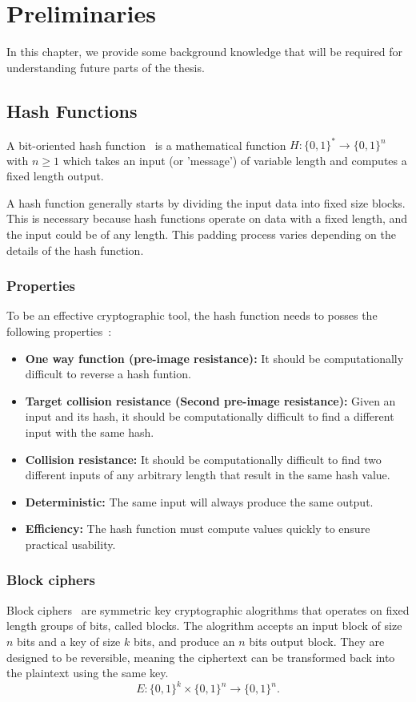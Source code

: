 \chapter{Preliminaries}
\label{sec:theory}
In this chapter, we provide some background knowledge that will be required for understanding future parts of the thesis.

\section{Hash Functions}
A bit-oriented hash function~\cite{preneel1994cryptographic} is a mathematical function $H : \{0,1\}^* \rightarrow \{0,1\}^n$ with $n\geq1$ which takes an input (or 'message') of variable length and computes a fixed length output.

A hash function generally starts by dividing the input data into fixed size blocks. This is necessary because hash functions operate on data with a fixed length, and the input could be of any length. This padding process varies depending on the details of the hash function.

\subsection*{Properties}
To be an effective cryptographic tool, the hash function needs to posses the following properties~\cite{preneel1993analysis}:
\begin{itemize}
    \item \textbf{One way function (pre-image resistance):} It should be computationally difficult to reverse a hash funtion.
    \item \textbf{Target collision resistance (Second pre-image resistance):} Given an input and its hash, it should be computationally difficult to find a different input with the same hash.
    \item \textbf{Collision resistance:} It should be computationally difficult to find two different inputs of any arbitrary length that result in the same hash value.
    \item \textbf{Deterministic:} The same input will always produce the same output.
    \item \textbf{Efficiency:} The hash function must compute values quickly to ensure practical usability.
\end{itemize}

\subsection{Block ciphers}
Block ciphers~\cite{knudsen1999block} are symmetric key cryptographic alogrithms that operates on fixed length groups of bits, called blocks. The alogrithm accepts an input block of size $n$ bits and a key of size $k$ bits, and produce an $n$ bits output block. They are designed to be reversible, meaning the ciphertext can be transformed back into the plaintext using the same key.
\begin{equation}
    E:\{0,1\}^k\times\{0,1\}^n\rightarrow\{0,1\}^n.
\end{equation}

